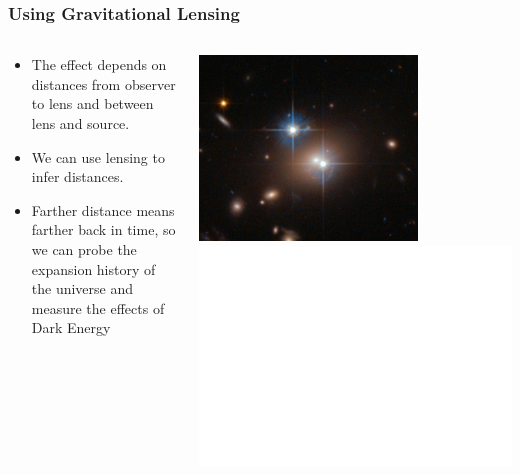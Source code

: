\documentclass{beamer}
\begin{document}
\frame
{

    \frametitle{Using Gravitational Lensing}


    \begin{columns}
        \begin{column}{0.5\textwidth}
            \begin{itemize}

                \item The effect depends on distances from observer to lens
                    and between lens and source.

                \item We can use lensing to infer distances.

                \item Farther distance means farther back in time, so we can
                    probe the expansion history of the universe and measure
                    the effects of Dark Energy

            \end{itemize}
        \end{column}
        \begin{column}{0.5\textwidth}
            \begin{center}
                \includegraphics[width=0.7\textwidth]{QSO_B0957+0561-crop.jpg}
                \newline
                \includegraphics[width=\textwidth]{lens_geometry_invert.pdf}
            \end{center}


\end{column}
\end{columns}}
\end{document}
